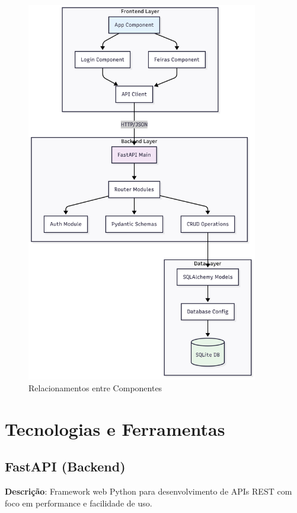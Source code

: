 \documentclass[12pt,a4paper]{article}
\begin{document}
\begin{figure}[h]
    \centering
    \includegraphics[width=0.9\textwidth]{diagrams/componentes.png}
    \caption{Relacionamentos entre Componentes}
    \label{fig:componentes}
\end{figure}

\section{Tecnologias e Ferramentas}

\subsection{FastAPI (Backend)}

\textbf{Descrição}: Framework web Python para desenvolvimento de APIs REST com foco em performance e facilidade de uso.
\end{document}
